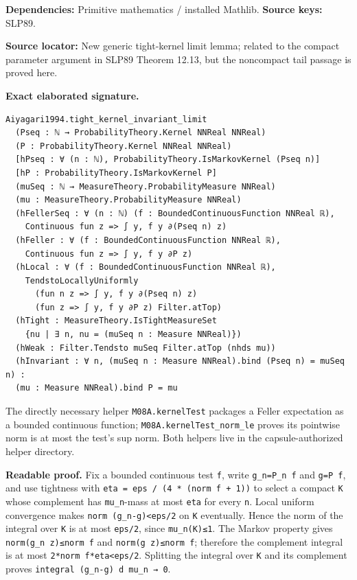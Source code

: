 \documentclass[
  11pt,
]{article}
\let\LedgerOriginalTexttt\texttt
\renewcommand{\texttt}[1]{{\small\LedgerOriginalTexttt{#1}}}
\begin{document}
\textbf{Dependencies:} Primitive mathematics / installed Mathlib.
\textbf{Source keys:} SLP89.

\textbf{Source locator:} New generic tight-kernel limit lemma; related
to the compact parameter argument in SLP89 Theorem 12.13, but the
noncompact tail passage is proved here.

\textbf{Exact elaborated signature.}

\begin{verbatim}
Aiyagari1994.tight_kernel_invariant_limit
  (Pseq : ℕ → ProbabilityTheory.Kernel NNReal NNReal)
  (P : ProbabilityTheory.Kernel NNReal NNReal)
  [hPseq : ∀ (n : ℕ), ProbabilityTheory.IsMarkovKernel (Pseq n)]
  [hP : ProbabilityTheory.IsMarkovKernel P]
  (muSeq : ℕ → MeasureTheory.ProbabilityMeasure NNReal)
  (mu : MeasureTheory.ProbabilityMeasure NNReal)
  (hFellerSeq : ∀ (n : ℕ) (f : BoundedContinuousFunction NNReal ℝ),
    Continuous fun z => ∫ y, f y ∂(Pseq n) z)
  (hFeller : ∀ (f : BoundedContinuousFunction NNReal ℝ),
    Continuous fun z => ∫ y, f y ∂P z)
  (hLocal : ∀ (f : BoundedContinuousFunction NNReal ℝ),
    TendstoLocallyUniformly
      (fun n z => ∫ y, f y ∂(Pseq n) z)
      (fun z => ∫ y, f y ∂P z) Filter.atTop)
  (hTight : MeasureTheory.IsTightMeasureSet
    {nu | ∃ n, nu = (muSeq n : Measure NNReal)})
  (hWeak : Filter.Tendsto muSeq Filter.atTop (nhds mu))
  (hInvariant : ∀ n, (muSeq n : Measure NNReal).bind (Pseq n) = muSeq n) :
  (mu : Measure NNReal).bind P = mu
\end{verbatim}

The directly necessary helper \texttt{M08A.kernelTest} packages a Feller
expectation as a bounded continuous function;
\texttt{M08A.kernelTest\_norm\_le} proves its pointwise norm is at most
the test's sup norm. Both helpers live in the capsule-authorized helper
directory.

\textbf{Readable proof.} Fix a bounded continuous test \texttt{f}, write
\texttt{g\_n=P\_n\ f} and \texttt{g=P\ f}, and use tightness with
\texttt{eta\ =\ eps\ /\ (4\ *\ (norm\ f\ +\ 1))} to select a compact
\texttt{K} whose complement has \texttt{mu\_n}-mass at most \texttt{eta}
for every \texttt{n}. Local uniform convergence makes
\texttt{norm\ (g\_n-g)\textless{}eps/2} on \texttt{K} eventually. Hence
the norm of the integral over \texttt{K} is at most \texttt{eps/2},
since \texttt{mu\_n(K)≤1}. The Markov property gives
\texttt{norm(g\_n\ z)≤norm\ f} and \texttt{norm(g\ z)≤norm\ f};
therefore the complement integral is at most
\texttt{2*norm\ f*eta\textless{}eps/2}. Splitting the integral over
\texttt{K} and its complement proves
\texttt{integral\ (g\_n-g)\ d\ mu\_n\ →\ 0}.
\end{document}
